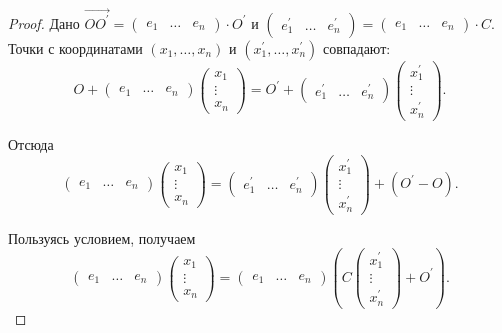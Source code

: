 \begin{proof}
    Дано $\overrightarrow{OO^\prime} = 
    \begin{pmatrix}
        e_1 & \ldots & e_n
    \end{pmatrix} \cdot O^\prime$ и $
    \begin{pmatrix}
        e_1^\prime & \ldots & e_n^\prime
    \end{pmatrix} = 
    \begin{pmatrix}
        e_1 & \ldots & e_n
    \end{pmatrix} \cdot C 
    $. Точки с координатами $(x_1, \ldots, x_n)$ и $(x_1^\prime, \ldots, x_n^\prime)$ совпадают:
    $$
    O +
    \begin{pmatrix}
        e_1 & \ldots & e_n
    \end{pmatrix}
    \begin{pmatrix}
        x_1\\
        \vdots\\
        x_n
    \end{pmatrix} = O^\prime +
    \begin{pmatrix}
        e_1^\prime & \ldots & e_n^\prime
    \end{pmatrix}
    \begin{pmatrix}
        x_1^\prime\\
        \vdots\\
        x_n^\prime
    \end{pmatrix}.
    $$

    Отсюда
    $$
    \begin{pmatrix}
        e_1 & \ldots & e_n
    \end{pmatrix}
    \begin{pmatrix}
        x_1\\
        \vdots\\
        x_n
    \end{pmatrix} = 
    \begin{pmatrix}
        e_1^\prime & \ldots & e_n^\prime
    \end{pmatrix}
    \begin{pmatrix}
        x_1^\prime\\
        \vdots\\
        x_n^\prime
    \end{pmatrix} + (O^\prime - O).
    $$

    Пользуясь условием, получаем
    $$
    \begin{pmatrix}
        e_1 & \ldots & e_n
    \end{pmatrix}
    \begin{pmatrix}
        x_1\\
        \vdots\\
        x_n
    \end{pmatrix} = 
    \begin{pmatrix}
        e_1 & \ldots & e_n
    \end{pmatrix} \left(C
    \begin{pmatrix}
        x_1^\prime\\
        \vdots\\
        x_n^\prime
    \end{pmatrix} + O^\prime\right).
    $$
    

\end{proof}
